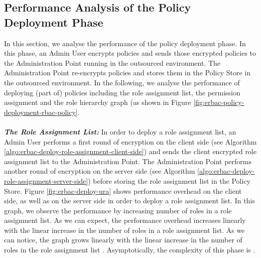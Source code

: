 \documentclass[epsfig,a4paper,11pt,titlepage]{book}
\numberwithin{algorithm}{chapter}
\begin{document}
\subsection{Performance Analysis of the Policy Deployment Phase}
In this section, we analyse the performance of the policy deployment phase. In this phase, an Admin User encrypts policies and sends those encrypted policies to the Administration Point running in the outsourced environment. The Administration Point re-encrypts policies and stores them in the Policy Store in the outsourced environment. In the following, we analyse the performance of deploying (part of) policies including the role assignment list, the permission assignment and the role hierarchy graph (as shown in Figure \ref{fig:erbac-policy-deployment-rbac-policy}. \\ \\
\noindent \emph{\textbf{The Role Assignment List:}} 
In order to deploy a role assignment list, an Admin User performs a first round of encryption on the client side (see Algorithm \ref{algo:erbac-deploy-role-assignment-client-side}) and sends the client encrypted role assignment list to the Administration Point. The Administration Point performs another round of encryption on the server side (see Algorithm \ref{algo:erbac-deploy-role-assignment-server-side}) before storing the role assignment list in the Policy Store. Figure \ref{fig:erbac-deploy-ura} shows performance overhead on the client side, as well as on the server side in order to deploy a role assignment list. In this graph, we observe the performance by increasing number of roles in a role assignment list. As we can expect, the performance overhead increases linearly with the linear increase in the number of roles in a role assignment list. As we can notice, the graph grows linearly with the linear increase in the number of roles in the role assignment list . Asymptotically, the complexity of this phase is .
\end{document}
